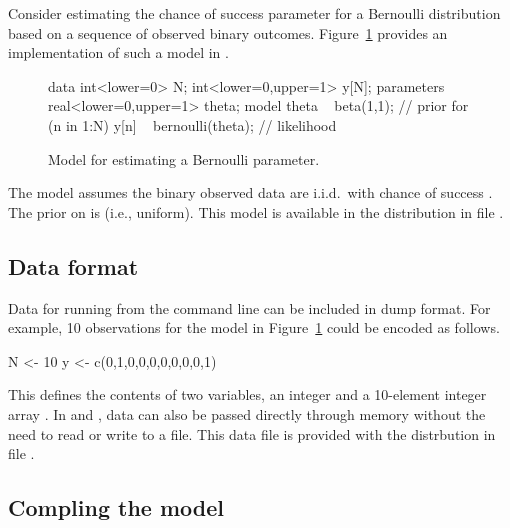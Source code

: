 \documentclass[article]{jss}
\begin{document}
Consider estimating the chance of success parameter for a Bernoulli
distribution based on a sequence of observed binary outcomes.  
Figure~\ref{bernoulli-model.fig} provides an implementation of such a
model in .
%
\begin{figure}
\begin{Code}
data { 
  int<lower=0> N; 
  int<lower=0,upper=1> y[N];
} 
parameters {
  real<lower=0,upper=1> theta;
} 
model {
  theta ~ beta(1,1);  // prior
  for (n in 1:N) 
    y[n] ~ bernoulli(theta);  // likelihood
}
\end{Code}
\caption{Model for estimating a Bernoulli parameter.}\label{bernoulli-model.fig}
\end{figure}
%
The model assumes the binary observed data  are
i.i.d.\ with chance of success .  The prior on
 is  (i.e., uniform).  This model is
available in the distribution in file .


\subsection{Data format}

Data for running  from the command line can be included
in  dump format.  For example, 10 observations for the
model in Figure~\ref{bernoulli-model.fig} could be encoded as follows.
%
\begin{Code}
N <- 10
y <- c(0,1,0,0,0,0,0,0,0,1)
\end{Code}
%
This defines the contents of two variables, an integer  and a
10-element integer array .  In  and ,
data can also be passed directly through memory without the need to
read or write to a file.  This data file is provided with the
 distrbution in file
.

\subsection{Compling the model}
\end{document}
